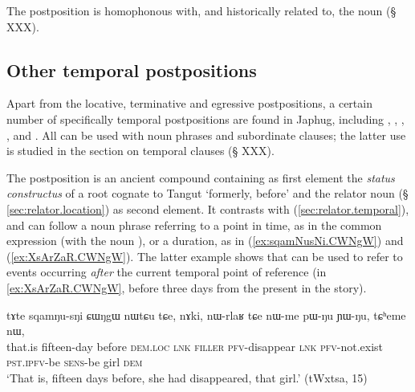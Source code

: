 The postposition  is homophonous with, and historically related to, the noun  (§ XXX).
 
 \subsection{Other temporal postpositions} \label{sec:temporal.postpositions}
Apart from the locative, terminative and egressive postpositions, a certain number of specifically temporal postpositions are found in Japhug, including ,  , , ,  and . All can be used with noun phrases and subordinate clauses; the latter use is studied in the section on temporal clauses (§ XXX).

The postposition   is an ancient compound containing as first element the \textit{status constructus} of a root cognate to Tangut  `formerly, before' and the relator noun  (§ \ref{sec:relator.location}) as second element. It contrasts with   (\ref{sec:relator.temporal}), and can follow a noun phrase referring to a point in time, as in the common expression  (with the noun  ), or a duration, as in (\ref{ex:sqamNusNi.CWNgW}) and (\ref{ex:XsArZaR.CWNgW}). The latter example shows that  can be used to refer to events occurring \textit{after} the current temporal point of reference (in \ref{ex:XsArZaR.CWNgW}, before three days from the present in the story).

\begin{exe}
\ex \label{ex:sqamNusNi.CWNgW}
 \gll tɤte sqamŋu-sŋi ɕɯŋgɯ nɯtɕu tɕe, nɤki, nɯ-rlaʁ tɕe nɯ-me pɯ-ŋu ɲɯ-ŋu, tɕʰeme nɯ, \\
 that.is fifteen-day before \textsc{dem}.\textsc{loc} \textsc{lnk} \textsc{filler} \textsc{pfv}-disappear \textsc{lnk} \textsc{pfv}-not.exist \textsc{pst}.\textsc{ipfv}-be \textsc{sens}-be girl \textsc{dem} \\
 \glt `That is, fifteen days before, she had disappeared, that girl.' (tWxtsa, 15)
\end{exe}


